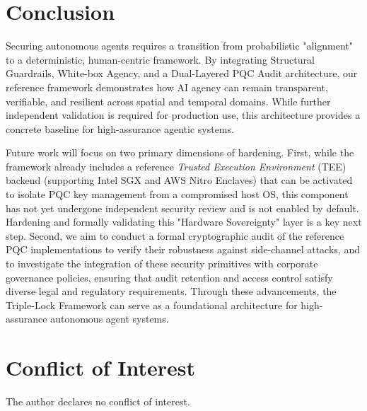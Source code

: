 \documentclass[conference]{IEEEtran}
\begin{document}
\section{Conclusion}
Securing autonomous agents requires a transition from probabilistic "alignment" to a deterministic, human-centric framework. By integrating Structural Guardrails, White-box Agency, and a Dual-Layered PQC Audit architecture, our reference framework demonstrates how AI agency can remain transparent, verifiable, and resilient across spatial and temporal domains. While further independent validation is required for production use, this architecture provides a concrete baseline for high-assurance agentic systems.

Future work will focus on two primary dimensions of hardening. First, while the framework already includes a reference \textit{Trusted Execution Environment} (TEE) backend (supporting Intel SGX and AWS Nitro Enclaves) that can be activated to isolate PQC key management from a compromised host OS, this component has not yet undergone independent security review and is not enabled by default. Hardening and formally validating this "Hardware Sovereignty" layer is a key next step. Second, we aim to conduct a formal cryptographic audit of the reference PQC implementations to verify their robustness against side-channel attacks, and to investigate the integration of these security primitives with corporate governance policies, ensuring that audit retention and access control satisfy diverse legal and regulatory requirements. Through these advancements, the Triple-Lock Framework can serve as a foundational architecture for high-assurance autonomous agent systems.

\section*{Conflict of Interest}
The author declares no conflict of interest.
\end{document}

